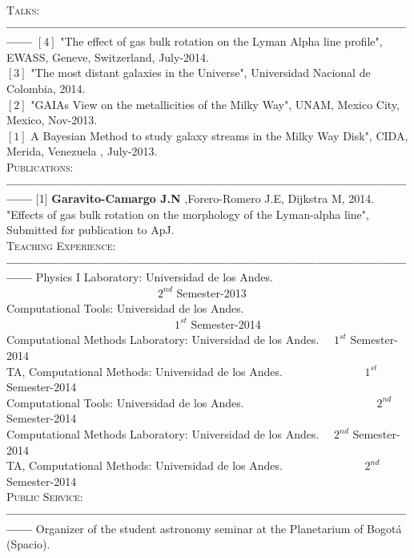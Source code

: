 \documentclass[letterpaper]{article}
\begin{document}
\textsc{\Large Talks:}\\
{\bf---------------------------------------------------------------------------------------------------}
$\left[4\right]$ "The effect of gas bulk rotation on the Lyman Alpha line profile", EWASS, Geneve, Switzerland, July-2014.\\
$\left[3\right]$  "The most distant galaxies in the Universe", Universidad Nacional de Colombia, 2014.\\
$\left[2\right]$ "GAIAs View on the metallicities of the Milky Way", UNAM, Mexico City, Mexico, Nov-2013. \\
$\left[1\right]$  A Bayesian Method to study galaxy streams in the Milky Way Disk", CIDA, Merida, Venezuela , July-2013.\\

\textsc{\Large Publications:}\\
{\bf---------------------------------------------------------------------------------------------------}
[1] {\bf Garavito-Camargo J.N} ,Forero-Romero J.E, Dijkstra M, 2014. "Effects of gas bulk rotation on the morphology of the Lyman-alpha line", Submitted for publication to ApJ.\\

\textsc{\Large Teaching Experience:}\\
{\bf---------------------------------------------------------------------------------------------------}
Physics I Laboratory: Universidad de los Andes. \indent \ \ \ \ \ \ \ \ \ \ \ \ \ \ \ \ \ \ \ \ \ \ \ \ \ \ \ $2^{nd}$ Semester-2013\\
Computational Tools: Universidad de los Andes. \indent \ \ \ \ \ \ \ \ \ \ \ \ \ \ \ \ \ \ \ \ \ \ \ \ \ \ \ \ \ \ $1^{st}$ Semester-2014\\
Computational Methods Laboratory: Universidad de los Andes. \indent  \ \ $1^{st}$ Semester-2014\\
TA, Computational Methods: Universidad de los Andes. \indent \ \ \ \ \ \ \ \ \ \ \ \ \ \   $1^{st}$ Semester-2014\\
Computational Tools: Universidad de los Andes. \indent \ \ \ \ \ \ \ \ \ \ \ \ \ \ \ \ \ \ \ \ \ \ \ $2^{nd}$ Semester-2014\\
Computational Methods Laboratory: Universidad de los Andes. \indent  \ \ $2^{nd}$ Semester-2014\\
TA, Computational Methods: Universidad de los Andes. \indent \ \ \ \ \ \ \ \ \ \ \ \ \ \   $2^{nd}$ Semester-2014\\

\textsc{\Large Public Service:}\\
{\bf---------------------------------------------------------------------------------------------------}
Organizer of the student astronomy seminar at the Planetarium of Bogot\'a (Spacio).
\end{document}
